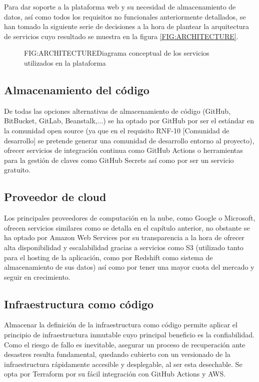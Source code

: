 
Para dar soporte a la plataforma web y su necesidad de almacenamiento de datos, así como todos los requisitos no funcionales anteriormente detallados, se han tomado la siguiente serie de decisiones a la hora de plantear la arquitectura de servicios cuyo resultado se muestra en la figura \ref{FIG:ARCHITECTURE}.

\begin{figure}[]{FIG:ARCHITECTURE}{Diagrama conceptual de los servicios utilizados en la plataforma}
\end{figure}

\subsection{Almacenamiento del código}

De todas las opciones alternativas de almacenamiento de código (GitHub, BitBucket, GitLab, Beanstalk,...) se ha optado por GitHub por ser el estándar en la comunidad open source (ya que en el requisito RNF-10 [Comunidad de desarrollo] se pretende generar una comunidad de desarrollo entorno al proyecto), ofrecer servicios de integración continua como GitHub Actions o herramientas para la gestión de claves como GitHub Secrets así como por ser un servicio gratuito.

\subsection{Proveedor de cloud}

Los principales proveedores de computación en la nube, como Google o Microsoft, ofrecen servicios similares como se detalla en el capítulo anterior, no obstante se ha optado por Amazon Web Services por su transparencia a la hora de ofrecer alta disponibilidad y escalabilidad gracias a servicios como S3 (utilizado tanto para el hosting de la aplicación, como por Redshift como sistema de almacenamiento de sus datos) así como por tener una mayor cuota del mercado y seguir en crecimiento.

\subsection{Infraestructura como código}

Almacenar la definición de la infraestructura como código permite aplicar el principio de infraestructura inmutable\cite{InfraAsCode} cuyo principal beneficio es la confiabilidad. Como el riesgo de fallo es inevitable, asegurar un proceso de recuperación ante desastres resulta fundamental, quedando cubierto con un versionado de la infraestructura rápidamente accesible y desplegable, al ser esta desechable. Se opta por Terraform por su fácil integración con GitHub Actions y AWS.

